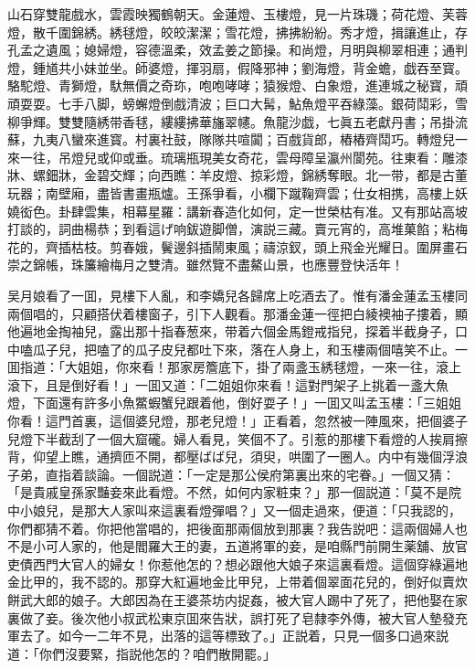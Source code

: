 山石穿雙龍戲水，雲霞映獨鶴朝天。金蓮燈、玉樓燈，見一片珠璣；荷花燈、芙蓉燈，散千圍錦綉。綉毬燈，皎皎潔潔；雪花燈，拂拂紛紛。秀才燈，揖讓進止，存孔孟之遺風；媳婦燈，容德溫柔，效孟姜之節操。和尚燈，月明與柳翠相連；通判燈，鍾馗共小妹並坐。師婆燈，揮羽扇，假降邪神；劉海燈，背金蟾，戯吞至寳。駱駝燈、青獅燈，馱無價之奇珎，咆咆哮哮；猿猴燈、白象燈，進連城之秘寳，頑頑耍耍。七手八脚，螃蠏燈倒戲清波；巨口大髯，鮎魚燈平吞綠藻。銀荷鬦彩，雪柳爭輝。雙雙隨綉带香毬，縷縷拂華旛翠幰。魚龍沙戯，七眞五老獻丹書；吊掛流蘇，九夷八蠻來進寳。村裏社鼓，隊隊共喧闐；百戲貨郎，樁樁齊鬦巧。轉燈兒一來一往，吊燈兒或仰或垂。琉璃瓶現美女奇花，雲母障呈瀛州閬苑。往東看：雕漆牀、螺鈿牀，金碧交輝；向西瞧：羊皮燈、掠彩燈，錦綉奪眼。北一带，都是古董玩器；南壁廂，盡皆書畫瓶爐。王孫爭看，小欄下蹴鞠齊雲；仕女相携，高樓上妖嬈衒色。卦肆雲集，相幕星羅：講新春造化如何，定一世榮枯有准。又有那站高坡打談的，詞曲楊恭；到看這げ响鈸遊脚僧，演説三藏。賣元宵的，高堆菓餡；粘梅花的，齊插枯枝。剪春娥，鬢邊斜插鬧東風；禱涼釵，頭上飛金光耀日。圍屏畫石崇之錦帳，珠簾繪梅月之雙清。雖然覽不盡鰲山景，也應豐登快活年！

吴月娘看了一囬，見樓下人亂，和李嬌兒各歸席上吃酒去了。惟有潘金蓮孟玉樓同兩個唱的，只顧搭伏着樓窗子，引下人觀看。那潘金蓮一徑把白綾襖袖子摟着，顯他遍地金掏袖兒，露出那十指春葱來，带着六個金馬鐙戒指兒，探着半截身子，口中嗑瓜子兒，把嗑了的瓜子皮兒都吐下來，落在人身上，和玉樓兩個嘻笑不止。一囬指道：「大姐姐，你來看！那家房簷底下，掛了兩盞玉綉毬燈，一來一往，滾上滾下，且是倒好看！」一囬又道：「二姐姐你來看！這對門架子上挑着一盞大魚燈，下面還有許多小魚鱉蝦蟹兒跟着他，倒好耍子！」一囬又叫孟玉樓：「三姐姐你看！這門首裏，這個婆兒燈，那老兒燈！」正看着，忽然被一陣風來，把個婆子兒燈下半截刮了一個大窟礲。婦人看見，笑個不了。引惹的那樓下看燈的人挨肩擦背，仰望上瞧，通擠匝不開，都壓ばば兒，須臾，哄圍了一圈人。内中有幾個浮浪子弟，直指着談論。一個説道：「一定是那公侯府第裏出來的宅眷。」一個又猜：「是貴戚皇孫家豔妾來此看燈。不然，如何内家粧束？」那一個説道：「莫不是院中小娘兒，是那大人家叫來這裏看燈彈唱？」又一個走過來，便道：「只我認的，你們都猜不着。你把他當唱的，把後面那兩個放到那裏？我告説吧：這兩個婦人也不是小可人家的，他是閻羅大王的妻，五道將軍的妾，是咱縣門前開生薬舖、放官吏債西門大官人的婦女！你惹他怎的？想必跟他大娘子來這裏看燈。這個穿綠遍地金比甲的，我不認的。那穿大紅遍地金比甲兒，上带着個翠面花兒的，倒好似賣炊餅武大郎的娘子。大郎因為在王婆茶坊内捉姦，被大官人踢中了死了，把他娶在家裏做了妾。後次他小叔武松東京囬來告狀，誤打死了皂隸李外傳，被大官人墊發充軍去了。如今一二年不見，出落的這等標致了。」正説着，只見一個多口過來説道：「你們沒要緊，指説他怎的？咱們散開罷。」

